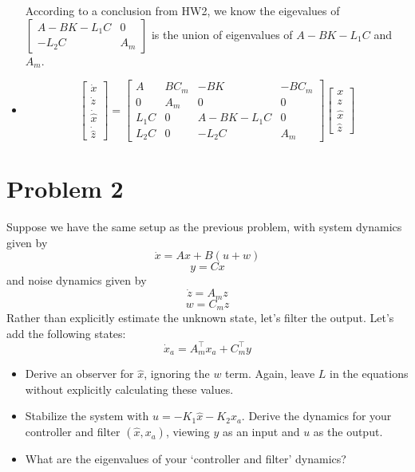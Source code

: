 \documentclass[11pt]{report}
\newcommand{\T}{\intercal}
\begin{document}
\begin{itemize}
According to a conclusion from HW2, we know the eigevalues of $\begin{bmatrix} A-BK-L_1C & 0 \\-L_2C & A_m \end{bmatrix}$ is the union of eigenvalues of $A-BK-L_1C$ and $A_m$.
\item $$\begin{bmatrix} \dot{x} \\ \dot{z} \\ \dot{\hat{x}}\\ \dot{\hat{z}} \end{bmatrix} = \begin{bmatrix} A & BC_m & -BK & -BC_m\\ 0 & A_m & 0 & 0\\ L_1C & 0 & A-BK-L_1C & 0 \\ L_2C & 0 & -L_2C & A_m \end{bmatrix} \begin{bmatrix} x \\ z \\ \hat{x}\\ \hat{z} \end{bmatrix}$$
\end{itemize}

\pagebreak
\section*{Problem 2}

Suppose we have the same setup as the previous problem, with system dynamics given by
\[
\dot x = Ax + B(u+w)
\]
\[
y = Cx
\]
and noise dynamics given by
\[
\dot z = A_m z
\]
\[
w = C_m z
\]
Rather than explicitly estimate the unknown state, let's filter the output. Let's add the following states:
\[
\dot x_a = A_m^\T x_a + C_m^\T y
\]
\begin{itemize}
\item
Derive an observer for $\widehat x$, ignoring the $w$ term.
Again, leave $L$ in the equations without explicitly calculating these values.
\item
Stabilize the system with $u = -K_1 \widehat x - K_2 x_a$. Derive the dynamics for your controller and filter $(\widehat x,x_a)$, viewing $y$ as an input and $u$ as the output.
\item
What are the eigenvalues of your `controller and filter' dynamics?
\end{itemize}
\end{document}
